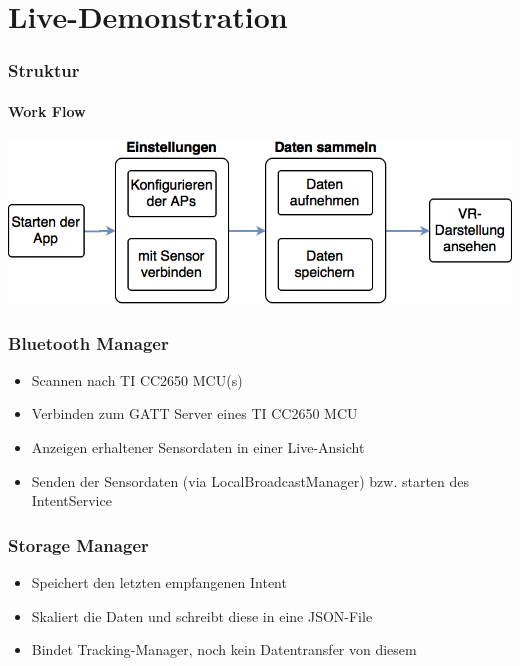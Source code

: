 \documentclass{beamer}
\begin{document}
\section{Live-Demonstration}

\begin{frame}
\frametitle{Struktur}
\framesubtitle{Work Flow}
	\includegraphics[width=\textwidth]{diagram/workflow.png}
\end{frame}


\begin{frame}
\frametitle{Bluetooth Manager}
\begin{itemize}
  \item Scannen nach TI CC2650 MCU(s)
  \item Verbinden zum GATT Server eines TI CC2650 MCU
  \item Anzeigen erhaltener Sensordaten in einer Live-Ansicht
  \item Senden der Sensordaten (via LocalBroadcastManager) bzw. starten des IntentService
\end{itemize}
\end{frame}

\begin{frame}
\frametitle{Storage Manager}
\begin{itemize}
  \item Speichert den letzten empfangenen Intent
  \item Skaliert die Daten und schreibt diese in eine JSON-File
  \item Bindet Tracking-Manager, noch kein Datentransfer von diesem
\end{itemize}
\end{frame}
\end{document}
